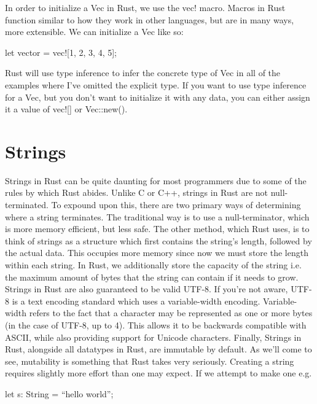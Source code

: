 \documentclass{article}
\begin{document}
In order to initialize a 
Vec in Rust, we use the vec! macro. Macros in Rust function similar to how they work 
in other languages, but are in many ways, more extensible. We can initialize a Vec like so: 

\begin{rustlst}

let vector = vec![1, 2, 3, 4, 5];

\end{rustlst}

Rust will use type inference to infer the concrete type of Vec in all of the examples where I’ve omitted 
the explicit type. If you want to use type inference for a Vec, but you don’t want to 
initialize it with any data, you can either assign it a value of vec![] or Vec::new().

\section{Strings}

Strings in Rust can be quite daunting for most programmers due to some of the rules by which Rust abides. 
Unlike C or C++, strings in Rust are not null-terminated. To expound upon this, there are two primary ways of 
determining where a string terminates. The traditional way is to use a null-terminator, which is more memory 
efficient, but less safe. The other method, which Rust uses, is to think of strings as a structure which first 
contains the string’s length, followed by the actual data. This occupies more memory since now we must store 
the length within each string. In Rust, we additionally store the capacity of the string i.e. the maximum 
amount of bytes that the string can contain if it needs to grow. Strings in Rust are also guaranteed to be 
valid UTF-8. If you’re not aware, UTF-8 is a text encoding standard which uses a variable-width encoding. 
Variable-width refers to the fact that a character may be represented as one or more bytes (in the case of 
UTF-8, up to 4). This allows it to be backwards compatible with ASCII, while also providing support for 
Unicode characters. Finally, Strings in Rust, alongside all datatypes in Rust, are immutable by default. As 
we’ll come to see, mutability is something that Rust takes very seriously. Creating a string 
requires slightly more effort than one may expect. If we attempt to make one e.g. 

\begin{rustlst}

let s: String = “hello world”; 

\end{rustlst}
\end{document}
